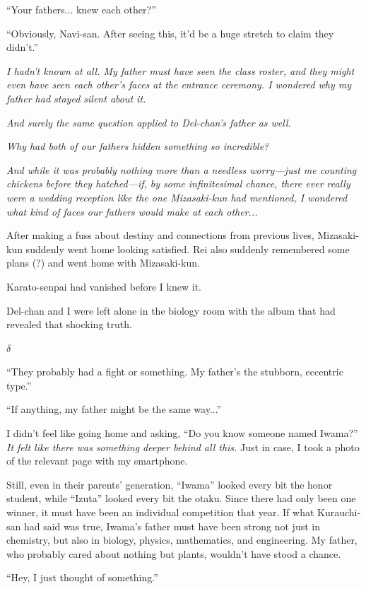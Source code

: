 \documentclass[
    a4paper,
    12pt,
    twoside,
    openany,
    UTF8,
    fontset=windows
]{ctexbook}
\begin{document}
``Your fathers... knew each other?''

``Obviously, Navi-san. After seeing this, it'd be a huge stretch to claim they didn't.''

\textit{I hadn't known at all. My father must have seen the class roster, and they might even have seen each other's faces at the entrance ceremony. I wondered why my father had stayed silent about it.}

\textit{And surely the same question applied to Del-chan's father as well.}

\textit{Why had both of our fathers hidden something so incredible?}

\textit{And while it was probably nothing more than a needless worry---just me counting chickens before they hatched---if, by some infinitesimal chance, there ever really were a wedding reception like the one Mizasaki-kun had mentioned, I wondered what kind of faces our fathers would make at each other...}

After making a fuss about destiny and connections from previous lives, Mizasaki-kun suddenly went home looking satisfied. Rei also suddenly remembered some plans (?) and went home with Mizasaki-kun.

Karato-senpai had vanished before I knew it.

Del-chan and I were left alone in the biology room with the album that had revealed that shocking truth.

$\delta$

``They probably had a fight or something. My father's the stubborn, eccentric type.''

``If anything, my father might be the same way...''

I didn't feel like going home and asking, ``Do you know someone named Iwama?'' \textit{It felt like there was something deeper behind all this.} Just in case, I took a photo of the relevant page with my smartphone.

Still, even in their parents' generation, ``Iwama'' looked every bit the honor student, while ``Izuta'' looked every bit the otaku. Since there had only been one winner, it must have been an individual competition that year. If what Kurauchi-san had said was true, Iwama's father must have been strong not just in chemistry, but also in biology, physics, mathematics, and engineering. My father, who probably cared about nothing but plants, wouldn't have stood a chance.

``Hey, I just thought of something.''
\end{document}
